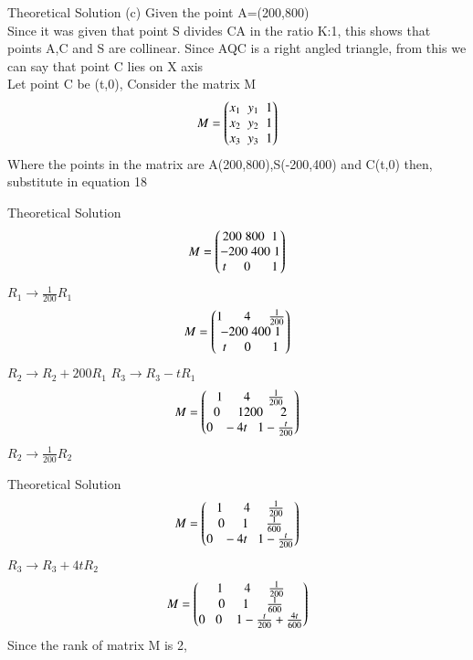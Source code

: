 \documentclass{beamer}
\begin{document}
    \begin{frame}{Theoretical Solution}
        (c) Given the point A=(200,800)\\
            Since it was given that point S divides CA in the ratio K:1, this shows that points A,C and S are collinear. Since AQC is a right angled triangle, from this we can say that point C lies on X axis\\
            Let point C be (t,0), Consider the matrix M\\
            \begin{align}
                M = \begin{pmatrix}x_1\;\;y_1\;\;1\\x_2\;\;y_2\;\;1\\x_3\;\;y_3\;\;1\end{pmatrix}
            \end{align}
            Where the points in the matrix are A(200,800),S(-200,400) and C(t,0) then,\\ substitute in equation 18
            
            
    \end{frame}
    \begin{frame}{Theoretical Solution}
           \begin{align}
                M = \begin{pmatrix}200\;800\;\;1\\-200\;400\;1\\t\;\;\;\;\;0\;\;\;\;\;\;1\end{pmatrix}
            \end{align}
           {\large$R_1\rightarrow{}\frac{1}{200}R_1$}
            \begin{align}
                 M = \begin{pmatrix}1\;\;\;\;\;\;4\;\;\;\;\;\frac{1}{200}\\-200\;400\;1\\t\;\;\;\;\;0\;\;\;\;\;\;1\end{pmatrix}
            \end{align}
            {\large$R_2\rightarrow{}R_2 + 200R_1$}\hspace{2cm}
            {\large$R_3\rightarrow{R_3 - tR_1}$}
            \begin{align}
                 M = \begin{pmatrix}1\;\;\;\;\;\;4\;\;\;\;\;\frac{1}{200}\\0\;\;\;\;\;1200\;\;\;\;\;2\\0\;\;\;-4t\;\;\;1-\frac{t}{200}\end{pmatrix}
            \end{align}
            {\large$R_2\rightarrow{\frac{1}{200}R_2}$}
    \end{frame}
    \begin{frame}{Theoretical Solution}
            \begin{align}
                M = \begin{pmatrix}1\;\;\;\;\;\;4\;\;\;\;\;\frac{1}{200}\\0\;\;\;\;\;1\;\;\;\;\;\frac{1}{600}\\0\;\;\;-4t\;\;\;1-\frac{t}{200}\end{pmatrix}
            \end{align}
            {\large$R_3\rightarrow{R_3 + 4tR_2}$}
            \begin{align}
                M = \begin{pmatrix}1\;\;\;\;\;\;4\;\;\;\;\;\frac{1}{200}\\0\;\;\;\;\;1\;\;\;\;\;\frac{1}{600}\\0\;\;\;0\;\;\;\;1-\frac{t}{200}+\frac{4t}{600}\end{pmatrix}
            \end{align}
            Since the rank of matrix M is 2,
    \end{frame}
\end{document}
